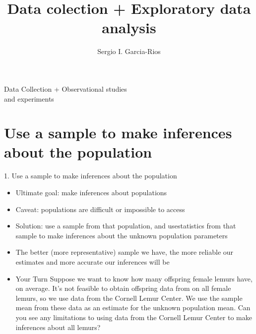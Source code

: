 \documentclass[11pt]{beamer}
\author{Sergio I. Garcia-Rios}
\title{Data colection + Exploratory data analysis}
\institute{Government 3990: Statistics in the Social Science}
\date{}
\begin{document}
\maketitle

\begin{frame}[standout]
\Large{Data Collection + Observational studies \\ and experiments}
\end{frame}


\section{Use a sample to make inferences about the population}
\label{mi1}


\begin{frame}{1. Use a sample to make inferences about the population}
\small{
\begin{itemize}[<+->]
\item Ultimate goal: make inferences about populations
\item Caveat: populations are difficult or impossible to access
\item Solution: use a sample from that population, and use\alert{statistics} from that 
sample to make inferences about the unknown population \alert{parameters}
\item The better (more \alert{representative}) sample we have, the more reliable our 
estimates and more accurate our inferences will be



\item[] \footnotesize{
\begin{exampleblock}{Your Turn}
Suppose we want to know how many offspring female lemurs have, on average.
It's not feasible to obtain offspring data from on all female lemurs, so we use 
data from the Cornell Lemur Center. We use the sample mean from these data as an 
estimate for the unknown population mean. Can you see any limitations to using data 
from the Cornell Lemur Center to make inferences about all lemurs?
\end{exampleblock}
}

\end{itemize}
}
\end{frame}

\end{document}
